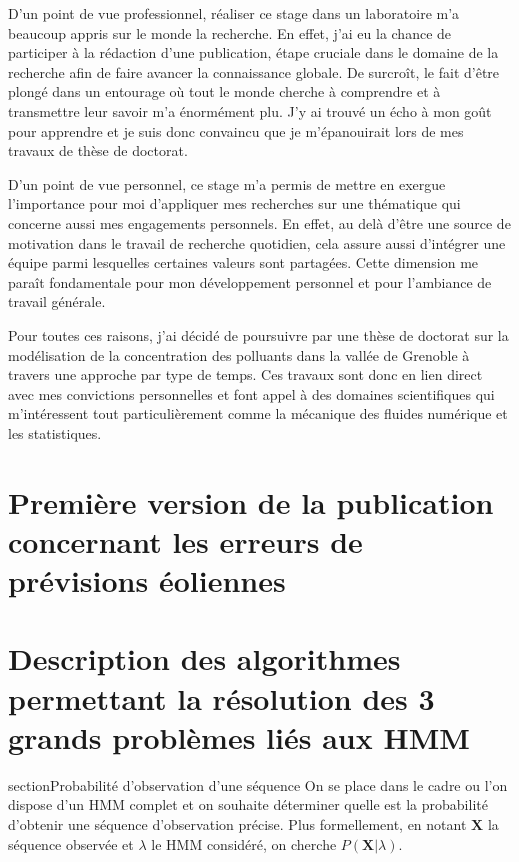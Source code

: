 \documentclass[12pt]{report}
\begin{document}
D'un point de vue professionnel, réaliser ce stage dans un laboratoire m'a beaucoup appris sur le monde la recherche. En effet, j'ai eu la chance de participer à la rédaction d'une publication, étape cruciale dans le domaine de la recherche afin de faire avancer la connaissance globale. De surcroît, le fait d'être plongé dans un entourage où tout le monde cherche à comprendre et à transmettre leur savoir m'a énormément plu.  J'y ai trouvé un écho à mon goût pour apprendre et je suis donc convaincu que je m'épanouirait lors de mes travaux de thèse de doctorat.

D'un point de vue personnel, ce stage m'a permis de mettre en exergue l'importance pour moi d'appliquer mes recherches sur une thématique qui concerne aussi mes engagements personnels. En effet, au delà d'être une source de motivation dans le travail de recherche quotidien, cela assure aussi d'intégrer une équipe parmi lesquelles certaines valeurs sont partagées. Cette dimension me paraît fondamentale pour mon développement personnel et pour l'ambiance de travail générale.

Pour toutes ces raisons, j'ai décidé de poursuivre par une thèse de doctorat sur la modélisation de la concentration des polluants dans la vallée de Grenoble à travers une approche par type de temps. Ces travaux sont donc en lien direct avec mes convictions personnelles et font appel à des domaines scientifiques qui m'intéressent tout particulièrement comme la mécanique des fluides numérique et les statistiques.


\appendix


\chapter{Première version de la publication concernant les erreurs de prévisions éoliennes}
\label{annex:ModelingWindPower}


\chapter{Description des algorithmes permettant la résolution des 3 grands problèmes liés aux HMM}
\label{annex:HMM_Algos}
section{Probabilité d’observation d’une séquence}
On se place dans  le cadre ou l'on dispose d'un HMM complet et on souhaite déterminer quelle est la probabilité d'obtenir une séquence d'observation précise. Plus formellement, en notant $\bm{X}$ la séquence observée et $\lambda$ le HMM considéré, on cherche $P(\bm{X}|\lambda)$.
\end{document}
